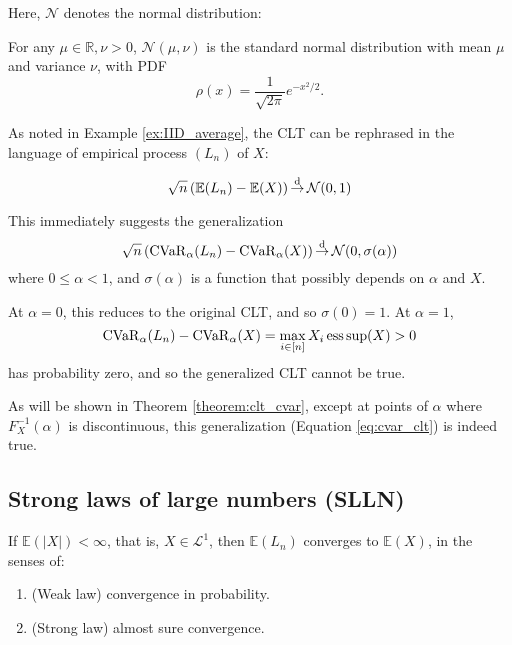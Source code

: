 Here, $\mathcal{N}$ denotes the normal distribution:
\begin{defn}\label{defn:normal_dist}
	For any $\mu\in \mathbb{R}, \nu > 0$, $\mathcal{N}(\mu, \nu)$ is the standard normal distribution with mean $\mu$ and variance $\nu$, with PDF
	\begin{equation}
	\rho(x) = \frac{1}{\sqrt{2\pi}} e^{-x^2/2}.
	\end{equation}
\end{defn}

As noted in Example \ref{ex:IID_average}, the CLT can be rephrased in the language of empirical process $(L_n)$ of $X$:

\begin{equation}
\label{eq:clt_2}
\sqrt{n}\, (\mathbb{E}(L_n) - \mathbb{E}(X)) \operatorname*{\stackrel{\text {d}}{\to}} \mathcal{N}(0, 1)
\end{equation}

This immediately suggests the generalization 
\begin{equation}\label{eq:cvar_clt}
\sqrt{n}\, (\operatorname{CVaR}_\alpha(L_n) - \operatorname{CVaR}_\alpha(X)) \operatorname*{\stackrel{\text {d}}{\to}} \mathcal{N}(0, \sigma(\alpha))
\end{equation}
where $0 \le \alpha < 1$, and $\sigma(\alpha)$ is a function that possibly depends on $\alpha$ and $X$. 

At $\alpha = 0$, this reduces to the original CLT, and so $\sigma(0)= 1$. At $\alpha = 1$, 
$$\operatorname{CVaR}_\alpha(L_n) - \operatorname{CVaR}_\alpha(X) = \max_{i\in[n]}X_i \operatorname*{ess\,sup}(X)> 0$$ 
has probability zero, and so the generalized CLT cannot be true.

As will be shown in Theorem \ref{theorem:clt_cvar}, except at points of $\alpha$ where $F_X^{-1}(\alpha)$ is discontinuous, this generalization (Equation \ref{eq:cvar_clt}) is indeed true.

\subsection{Strong laws of large numbers (SLLN)}

\begin{theorem}
If $\mathbb{E}(|X|)< \infty$, that is, $X\in \mathscr{L}^1$, then  $\mathbb{E}(L_n)$ converges to $\mathbb{E}(X)$, in the senses of:
\begin{enumerate}[(1)]
	\item (Weak law) convergence in probability.
	\item (Strong law) almost sure convergence.
\end{enumerate}
\end{theorem}

